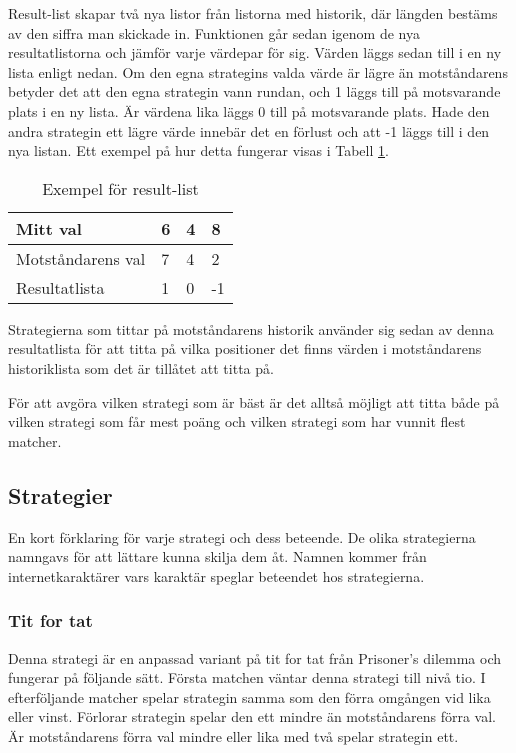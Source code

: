 Result-list skapar två nya listor från listorna med historik, där längden bestäms av den siffra man skickade in. Funktionen går sedan igenom de nya resultatlistorna och jämför varje värdepar för sig. Värden läggs sedan till i en ny lista enligt nedan. Om den egna strategins valda värde är lägre än motståndarens betyder det att den egna strategin vann rundan, och 1 läggs till på motsvarande plats i en ny lista. Är värdena lika läggs 0 till på motsvarande plats. Hade den andra strategin ett lägre värde innebär det en förlust och att -1 läggs till i den nya listan. Ett exempel på hur detta fungerar visas i Tabell \ref{table:result-list}.

\begin{table}[htb]
	\begin{center}
		\begin{tabular}{| l | l | l | l |}
			\hline
			Mitt val & 6 & 4 & 8 \\ \hline
			Motståndarens val & 7 & 4 & 2 \\ \hline
			Resultatlista & 1 & 0 & -1 \\ \hline
		\end{tabular}
	\end{center}
	\caption{Exempel för result-list}
	\label{table:result-list}
\end{table}

Strategierna som tittar på motståndarens historik använder sig sedan av denna resultatlista för att titta på vilka positioner det finns värden i motståndarens historiklista som det är tillåtet att titta på.

För att avgöra vilken strategi som är bäst är det alltså möjligt att titta både på vilken strategi som får mest poäng och vilken strategi som har vunnit flest matcher.

\subsection{Strategier}
En kort förklaring för varje strategi och dess beteende. De olika strategierna namngavs för att lättare kunna skilja dem åt. Namnen kommer från internetkaraktärer vars karaktär speglar beteendet hos strategierna.

\subsubsection{Tit for tat}
Denna strategi är en anpassad variant på tit for tat från Prisoner’s dilemma och fungerar på följande sätt. Första matchen väntar denna strategi till nivå tio. I efterföljande matcher spelar strategin samma som den förra omgången vid lika eller vinst. Förlorar strategin spelar den ett mindre än motståndarens förra val. Är motståndarens förra val mindre eller lika med två spelar strategin ett.

